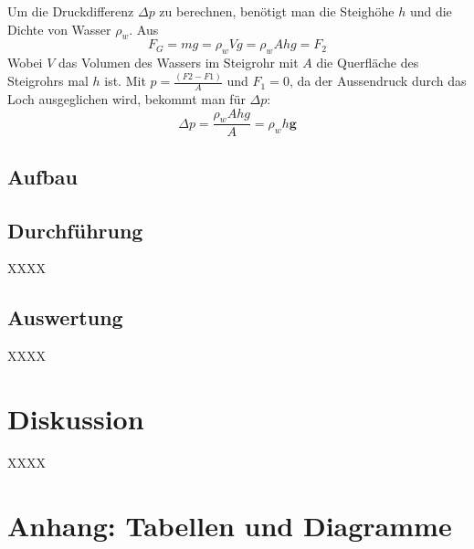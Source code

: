 \documentclass[11pt,a4paper]{article}
\newcommand{\halftime}[4]{\begin{figure}[h]
\begin{minipage}{.#1\textwidth}#3\end{minipage}\begin{minipage}{.#2\textwidth}
\centering
#4\end{minipage}
\end{figure}}
\renewcommand{\vec}{\boldsymbol}
\begin{document}
Um die Druckdifferenz $\Delta p$ zu berechnen, benötigt man die Steighöhe $h$ und die Dichte von Wasser $\rho_w$.
Aus
$$F_G = mg = \rho_w Vg = \rho_w Ahg = F_2$$
Wobei $V$ das Volumen des Wassers im Steigrohr mit $A$ die Querfläche des Steigrohrs mal $h$ ist.
Mit $p = \frac{(F2-F1)}{A}$ und $F_1 = 0$, da der Aussendruck durch das Loch ausgeglichen wird, bekommt man für $\Delta p$:
$$\Delta p = \frac{\rho_w Ahg}{A} = \rho_w h \vec{g}$$


\subsection{Aufbau}


\subsection{Durchführung}

XXXX

\subsection{Auswertung}

XXXX

\section{Diskussion}

XXXX

\pagebreak

\section{Anhang: Tabellen und Diagramme}
\end{document}
